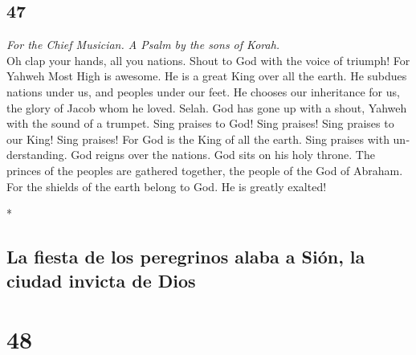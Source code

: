 \begin{paracol}{2}
\switchcolumn
\begin{otherlanguage}{english}

\hypertarget{section-93}{%
\section{47}\label{section-93}}

\emph{For the Chief Musician. A Psalm by the sons of Korah.}\\
 Oh clap your hands, all you nations. Shout to God with
the voice of triumph!  For Yahweh Most High is awesome. He
is a great King over all the earth.  He subdues nations
under us, and peoples under our feet.  He chooses our
inheritance for us, the glory of Jacob whom he loved. Selah.
 God has gone up with a shout, Yahweh with the sound of a
trumpet.  Sing praises to God! Sing praises! Sing praises
to our King! Sing praises!  For God is the King of all the
earth. Sing praises with understanding.  God reigns over
the nations. God sits on his holy throne.  The princes of
the peoples are gathered together, the people of the God of Abraham. For
the shields of the earth belong to God. He is greatly exalted!

\end{otherlanguage}

\switchcolumn[0]*

\hypertarget{la-fiesta-de-los-peregrinos-alaba-a-siuxf3n-la-ciudad-invicta-de-dios}{%
\subsection{La fiesta de los peregrinos alaba a Sión, la ciudad invicta
de
Dios}\label{la-fiesta-de-los-peregrinos-alaba-a-siuxf3n-la-ciudad-invicta-de-dios}}

\hypertarget{section-94}{%
\section{48}\label{section-94}}


\end{paracol}
